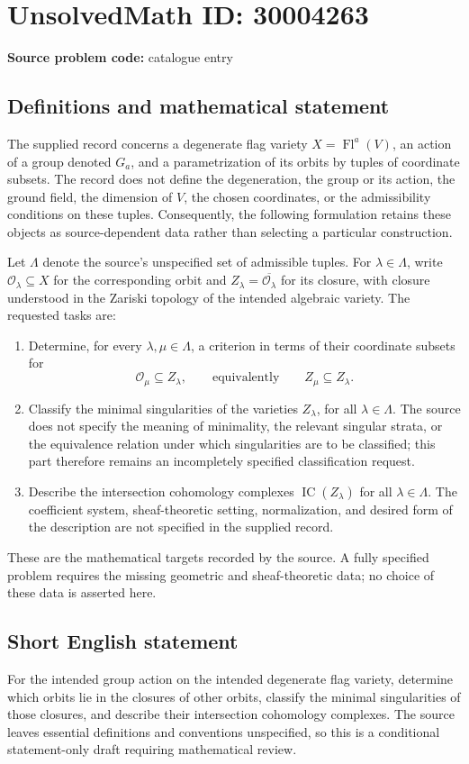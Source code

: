 \documentclass[11pt]{article}
\begin{document}
\section*{UnsolvedMath ID: 30004263}
\textbf{Source problem code:} catalogue entry
\subsection{Definitions and mathematical statement}
The supplied record concerns a degenerate flag variety \(X=\operatorname{Fl}^{a}(V)\), an action of a group denoted \(G_a\), and a parametrization of its orbits by tuples of coordinate subsets. The record does not define the degeneration, the group or its action, the ground field, the dimension of \(V\), the chosen coordinates, or the admissibility conditions on these tuples. Consequently, the following formulation retains these objects as source-dependent data rather than selecting a particular construction.

Let \(\Lambda\) denote the source's unspecified set of admissible tuples. For \(\lambda\in\Lambda\), write \(\mathcal O_\lambda\subseteq X\) for the corresponding orbit and \(Z_\lambda=\overline{\mathcal O_\lambda}\) for its closure, with closure understood in the Zariski topology of the intended algebraic variety. The requested tasks are:
\begin{enumerate}
\item Determine, for every \(\lambda,\mu\in\Lambda\), a criterion in terms of their coordinate subsets for
\[
\mathcal O_\mu\subseteq Z_\lambda,
\qquad\text{equivalently}\qquad
Z_\mu\subseteq Z_\lambda.
\]
\item Classify the minimal singularities of the varieties \(Z_\lambda\), for all \(\lambda\in\Lambda\). The source does not specify the meaning of minimality, the relevant singular strata, or the equivalence relation under which singularities are to be classified; this part therefore remains an incompletely specified classification request.
\item Describe the intersection cohomology complexes \(\operatorname{IC}(Z_\lambda)\) for all \(\lambda\in\Lambda\). The coefficient system, sheaf-theoretic setting, normalization, and desired form of the description are not specified in the supplied record.
\end{enumerate}
These are the mathematical targets recorded by the source. A fully specified problem requires the missing geometric and sheaf-theoretic data; no choice of these data is asserted here.
\subsection{Short English statement}
For the intended group action on the intended degenerate flag variety, determine which orbits lie in the closures of other orbits, classify the minimal singularities of those closures, and describe their intersection cohomology complexes. The source leaves essential definitions and conventions unspecified, so this is a conditional statement-only draft requiring mathematical review.
\end{document}
